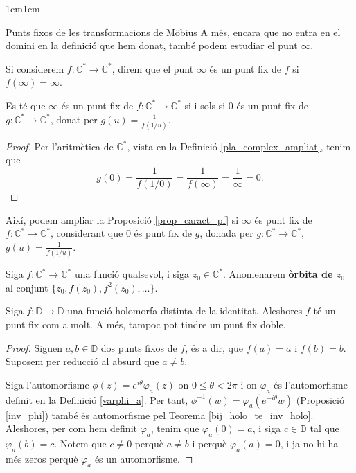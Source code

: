 \begin{adjustwidth}{1cm}{1cm}
\begin{subsection}{Punts fixos de les transformacions de Möbius}
A més, encara que no entra en el domini en la definició que hem donat, també podem estudiar el punt $\infty$.

\begin{definicio}
    Si considerem $f:\mathbb{C}^*\to \mathbb{C}^*$, direm que el punt $\infty$ és un punt fix de $f$ si $f(\infty)=\infty$.
\end{definicio}

\begin{proposicio}
    Es té que $\infty$ és un punt fix de $f:\mathbb{C}^*\to \mathbb{C}^*$ si i sols si $0$ és un punt fix de $g:\mathbb{C}^*\to \mathbb{C}^*$, donat per $g(u)=\frac{1}{f(1/u)}$.
    \label{punt_fix_inf}
\end{proposicio}

\begin{proof}
    Per l'aritmètica de $\mathbb{C}^*$, vista en la Definició \ref{pla_complex_ampliat}, tenim que
    \[
        g(0)=\frac{1}{f(1/0)}=\frac{1}{f(\infty)}=\frac{1}{\infty}=0.
    \]
\end{proof}

\begin{nota}
    Així, podem ampliar la Proposició \ref{prop_caract_pf} si $\infty$ és punt fix de $f:\mathbb{C}^*\to \mathbb{C}^*$, considerant que $0$ és punt fix de $g$, donada per $g:\mathbb{C}^*\to \mathbb{C}^*$, $g(u)=\frac{1}{f(1/u)}$.
\end{nota}

\begin{definicio}
    Siga $f:\mathbb{C}^*\to \mathbb{C}^*$ una funció qualsevol, i siga $z_0\in \mathbb{C}^*$. Anomenarem \textbf{òrbita de $z_0$} al conjunt $\{z_0, f(z_0),f^2(z_0),\dots\}$.
\end{definicio}

\begin{proposicio}
    Siga $f:\mathbb{D}\to \mathbb{D}$ una funció holomorfa distinta de la identitat. Aleshores $f$ té un punt fix com a molt. A més, tampoc pot tindre un punt fix doble.
    \label{max_1_punt_fix_en_D}
\end{proposicio}

\begin{proof}
    Siguen $a,b\in \mathbb{D}$ dos punts fixos de $f$, és a dir, que $f(a)=a$ i $f(b)=b$. Suposem per reducció al absurd que $a\neq b$.

    Siga l'automorfisme $\phi(z)=e^{i\theta}\varphi_a(z)$ on $0\leq\theta<2\pi$ i on $\varphi_a$ és l'automorfisme definit en la Definició \ref{varphi_a}. Per tant, $\phi^{-1}(w)=\varphi_a(e^{-i\theta}w)$ (Proposició \ref{inv_phi}) també és automorfisme pel Teorema \ref{bij_holo_te_inv_holo}. Aleshores, per com hem definit $\varphi_a$, tenim que $\varphi_a(0)=a$, i siga $c\in \mathbb{D}$ tal que $\varphi_a(b)=c$. Notem que $c\neq 0$ perquè $a\neq b$ i perquè $\varphi_a(a)=0$, i ja no hi ha més zeros perquè $\varphi_a$ és un automorfisme.


\end{proof}
\end{subsection}
\end{adjustwidth}
